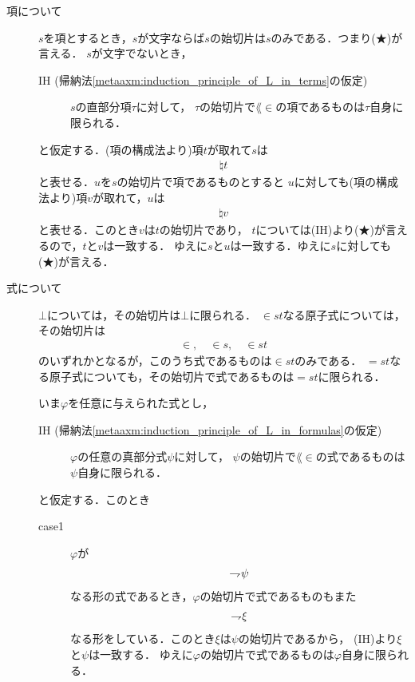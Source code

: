 	\begin{metaprf}\mbox{}
		\begin{description}
			\item[項について]
				$s$を項とするとき，$s$が文字ならば$s$の始切片は$s$のみである．つまり(★)が言える．
				$s$が文字でないとき，
				\begin{description}
					\item[IH (帰納法\ref{metaaxm:induction_principle_of_L_in_terms}の仮定)]
						$s$の直部分項$\tau$に対して，
						$\tau$の始切片で$\lang{\in}$の項であるものは$\tau$自身に限られる．
				\end{description}
				と仮定する．(項の構成法より)項$t$が取れて$s$は
				\begin{align}
					\natural t
				\end{align}
				と表せる．$u$を$s$の始切片で項であるものとすると
				$u$に対しても(項の構成法より)項$v$が取れて，$u$は
				\begin{align}
					\natural v
				\end{align}
				と表せる．このとき$v$は$t$の始切片であり，
				$t$については(IH)より(★)が言えるので，$t$と$v$は一致する．
				ゆえに$s$と$u$は一致する．ゆえに$s$に対しても(★)が言える．
				
			\item[式について]
				$\bot$については，その始切片は$\bot$に限られる．
				$\in st$なる原子式については，その始切片は
				\begin{align}
					\in, \quad \in s, \quad \in st
				\end{align}
				のいずれかとなるが，このうち式であるものは$\in st$のみである．
				$=st$なる原子式についても，その始切片で式であるものは$=st$に限られる．
	
				いま$\varphi$を任意に与えられた式とし，
				\begin{description}
					\item[IH (帰納法\ref{metaaxm:induction_principle_of_L_in_formulas}の仮定)]
					$\varphi$の任意の真部分式$\psi$に対して，
					$\psi$の始切片で$\lang{\in}$の式であるものは$\psi$自身に限られる．
				\end{description}
				と仮定する．このとき
				\begin{description}
					\item[case1] $\varphi$が
						\begin{align}
							\rightharpoondown\hspace{-0.25em} \psi
						\end{align}
						なる形の式であるとき，$\varphi$の始切片で式であるものもまた
						\begin{align}
							\rightharpoondown\hspace{-0.25em} \xi
						\end{align}
						なる形をしている．このとき$\xi$は$\psi$の始切片であるから，
						(IH)より$\xi$と$\psi$は一致する．
						ゆえに$\varphi$の始切片で式であるものは$\varphi$自身に限られる．
			

\end{description}
\end{description}
\end{metaprf}
